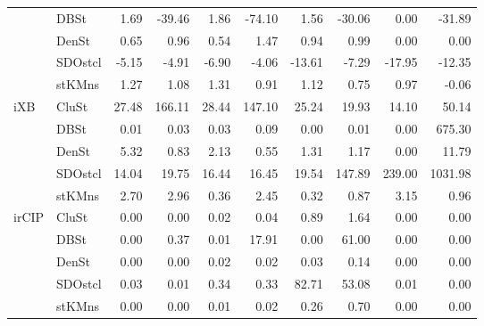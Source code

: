 \begin{table}
\begin{tabular}{llrrrrrrrr}
     & DBSt &       1.69 &      -39.46 &         1.86 &        -74.10 &          1.56 &         -30.06 &             0.00 &            -31.89 \\
     & DenSt &       0.65 &        0.96 &         0.54 &          1.47 &          0.94 &           0.99 &             0.00 &              0.00 \\
     & SDOstcl &      -5.15 &       -4.91 &        -6.90 &         -4.06 &        -13.61 &          -7.29 &           -17.95 &            -12.35 \\
     & stKMns &       1.27 &        1.08 &         1.31 &          0.91 &          1.12 &           0.75 &             0.97 &             -0.06 \\
iXB & CluSt &      27.48 &      166.11 &        28.44 &        147.10 &         25.24 &          19.93 &            14.10 &             50.14 \\
     & DBSt &       0.01 &        0.03 &         0.03 &          0.09 &          0.00 &           0.01 &             0.00 &            675.30 \\
     & DenSt &       5.32 &        0.83 &         2.13 &          0.55 &          1.31 &           1.17 &             0.00 &             11.79 \\
     & SDOstcl &      14.04 &       19.75 &        16.44 &         16.45 &         19.54 &         147.89 &           239.00 &           1031.98 \\
     & stKMns &       2.70 &        2.96 &         0.36 &          2.45 &          0.32 &           0.87 &             3.15 &              0.96 \\
irCIP & CluSt &       0.00 &        0.00 &         0.02 &          0.04 &          0.89 &           1.64 &             0.00 &              0.00 \\
     & DBSt &       0.00 &        0.37 &         0.01 &         17.91 &          0.00 &          61.00 &             0.00 &              0.00 \\
     & DenSt &       0.00 &        0.00 &         0.02 &          0.02 &          0.03 &           0.14 &             0.00 &              0.00 \\
     & SDOstcl &       0.03 &        0.01 &         0.34 &          0.33 &         82.71 &          53.08 &             0.01 &              0.00 \\
     & stKMns &       0.00 &        0.00 &         0.01 &          0.02 &          0.26 &           0.70 &             0.00 &              0.00 \\

\end{tabular}
\end{table}
